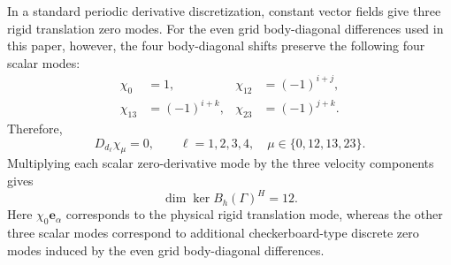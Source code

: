 \documentclass[11pt,oneside]{article}
\numberwithin{equation}{section}
\theoremstyle{plain}
\theoremstyle{remark}
\begin{document}
In a standard periodic derivative discretization, constant vector fields give three rigid translation zero modes. For the even grid body-diagonal differences used in this paper, however, the four body-diagonal shifts preserve the following four scalar modes:
\[
\begin{aligned}
\chi_0&=1,
&\chi_{12}&=(-1)^{i+j},\\
\chi_{13}&=(-1)^{i+k},
&\chi_{23}&=(-1)^{j+k}.
\end{aligned}
\]
Therefore,
\[
D_{d_\ell}\chi_\mu=0,\qquad
\ell=1,2,3,4,\quad
\mu\in\{0,12,13,23\}.
\]
Multiplying each scalar zero-derivative mode by the three velocity components gives
\[
\dim\ker B_h(\Gamma)^H=12.
\]
Here \(\chi_0\mathbf e_\alpha\) corresponds to the physical rigid translation mode, whereas the other three scalar modes correspond to additional checkerboard-type discrete zero modes induced by the even grid body-diagonal differences.



\end{document}
